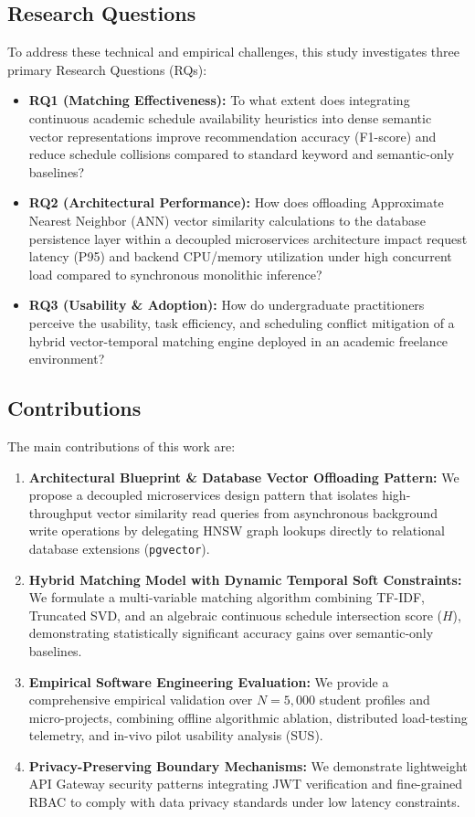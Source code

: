\documentclass[a4paper,fleqn]{cas-dc}
\begin{document}
\subsection{Research Questions}
To address these technical and empirical challenges, this study investigates three primary Research Questions (RQs):
\begin{itemize}
    \item \textbf{RQ1 (Matching Effectiveness):} To what extent does integrating continuous academic schedule availability heuristics into dense semantic vector representations improve recommendation accuracy (F1-score) and reduce schedule collisions compared to standard keyword and semantic-only baselines?
    \item \textbf{RQ2 (Architectural Performance):} How does offloading Approximate Nearest Neighbor (ANN) vector similarity calculations to the database persistence layer within a decoupled microservices architecture impact request latency (P95) and backend CPU/memory utilization under high concurrent load compared to synchronous monolithic inference?
    \item \textbf{RQ3 (Usability \& Adoption):} How do undergraduate practitioners perceive the usability, task efficiency, and scheduling conflict mitigation of a hybrid vector-temporal matching engine deployed in an academic freelance environment?
\end{itemize}

\subsection{Contributions}
The main contributions of this work are:
\begin{enumerate}
    \item \textbf{Architectural Blueprint \& Database Vector Offloading Pattern:} We propose a decoupled microservices design pattern that isolates high-throughput vector similarity read queries from asynchronous background write operations by delegating HNSW graph lookups directly to relational database extensions (\texttt{pgvector}).
    \item \textbf{Hybrid Matching Model with Dynamic Temporal Soft Constraints:} We formulate a multi-variable matching algorithm combining TF-IDF, Truncated SVD, and an algebraic continuous schedule intersection score ($H$), demonstrating statistically significant accuracy gains over semantic-only baselines.
    \item \textbf{Empirical Software Engineering Evaluation:} We provide a comprehensive empirical validation over $N = 5,000$ student profiles and micro-projects, combining offline algorithmic ablation, distributed load-testing telemetry, and in-vivo pilot usability analysis (SUS).
    \item \textbf{Privacy-Preserving Boundary Mechanisms:} We demonstrate lightweight API Gateway security patterns integrating JWT verification and fine-grained RBAC to comply with data privacy standards \cite{ley29733} under low latency constraints.
\end{enumerate}
\end{document}

